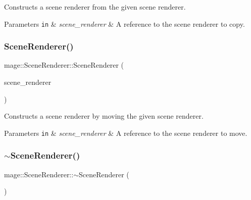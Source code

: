 Constructs a scene renderer from the given scene renderer.


\begin{DoxyParams}[1]{Parameters}
\mbox{\tt in}  & {\em scene\+\_\+renderer} & A reference to the scene renderer to copy. \\
\hline
\end{DoxyParams}
\hypertarget{classmage_1_1_scene_renderer_ab9846f0a77e2bc5e9eeb00aed67424eb}{}\label{classmage_1_1_scene_renderer_ab9846f0a77e2bc5e9eeb00aed67424eb} 
\subsubsection{\texorpdfstring{Scene\+Renderer()}{SceneRenderer()}\hspace{0.1cm}{\footnotesize\ttfamily [3/3]}}
{\footnotesize\ttfamily mage\+::\+Scene\+Renderer\+::\+Scene\+Renderer (\begin{DoxyParamCaption}\item[{\hyperlink{classmage_1_1_scene_renderer}{Scene\+Renderer} \&\&}]{scene\+\_\+renderer }\end{DoxyParamCaption})\hspace{0.3cm}{\ttfamily [default]}}

Constructs a scene renderer by moving the given scene renderer.


\begin{DoxyParams}[1]{Parameters}
\mbox{\tt in}  & {\em scene\+\_\+renderer} & A reference to the scene renderer to move. \\
\hline
\end{DoxyParams}
\hypertarget{classmage_1_1_scene_renderer_a546f45fc7542fa1677d3e9c2014f108e}{}\label{classmage_1_1_scene_renderer_a546f45fc7542fa1677d3e9c2014f108e} 
\subsubsection{\texorpdfstring{$\sim$\+Scene\+Renderer()}{~SceneRenderer()}}
{\footnotesize\ttfamily mage\+::\+Scene\+Renderer\+::$\sim$\+Scene\+Renderer (\begin{DoxyParamCaption}{ }\end{DoxyParamCaption})\hspace{0.3cm}{\ttfamily [default]}}

